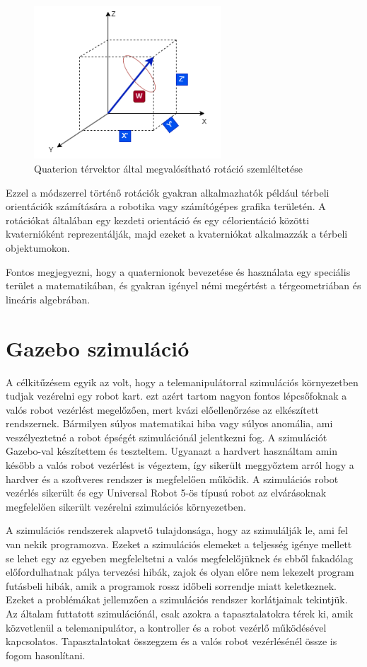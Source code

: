 \begin{figure}[!ht]
\centering
\includegraphics[width=70mm, keepaspectratio]{figures/Diagrammok/Quaterion}
\caption{Quaterion térvektor által megvalósítható rotáció szemléltetése}
\label{fig:Quaterion}
\end{figure}

Ezzel a módszerrel történő rotációk gyakran alkalmazhatók például térbeli orientációk számítására a robotika vagy számítógépes grafika területén. A rotációkat általában egy kezdeti orientáció és egy célorientáció közötti kvaternióként reprezentálják, majd ezeket a kvaterniókat alkalmazzák a térbeli objektumokon.

Fontos megjegyezni, hogy a quaternionok bevezetése és használata egy speciális terület a matematikában, és gyakran igényel némi megértést a térgeometriában és lineáris algebrában.


\section{Gazebo szimuláció}

A célkitűzésem egyik az volt, hogy a telemanipulátorral szimulációs környezetben tudjak vezérelni egy robot kart. ezt azért tartom nagyon fontos lépcsőfoknak a valós robot vezérlést megelőzően, mert kvázi előellenőrzése az elkészített rendszernek. Bármilyen súlyos matematikai hiba vagy súlyos anomália, ami veszélyeztetné a robot épségét szimulációnál jelentkezni fog. A szimulációt Gazebo-val készítettem és teszteltem. Ugyanazt a hardvert használtam amin később a valós robot vezérlést is végeztem, így sikerült meggyőztem arról hogy a hardver és a szoftveres rendszer is megfelelően működik. A szimulációs robot vezérlés sikerült és egy Universal Robot 5-ös típusú robot az elvárásoknak megfelelően sikerült vezérelni szimulációs környezetben.

A szimulációs rendszerek alapvető tulajdonsága, hogy az szimulálják le, ami fel van nekik programozva. Ezeket a szimulációs elemeket a teljesség igénye mellett se lehet egy az egyeben megfeleltetni a valós megfelelőjüknek és ebből fakadólag előfordulhatnak pálya tervezési hibák, zajok és olyan előre nem lekezelt program futásbeli hibák, amik a programok rossz időbeli sorrendje miatt keletkeznek. Ezeket a problémákat jellemzően a szimulációs rendszer korlátjainak tekintjük. Az általam futtatott szimulációnál, csak azokra a tapasztalatokra térek ki, amik közvetlenül a telemanipulátor, a kontroller és a robot vezérlő működésével kapcsolatos. Tapasztalatokat összegzem és a valós robot vezérlésénél össze is fogom hasonlítani.

